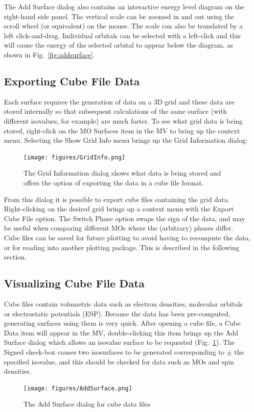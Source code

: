 \documentclass[a4paper,12pt]{article}
\begin{document}
The Add Surface dialog also contains an interactive energy level diagram on the
right-hand side panel.  The vertical scale can be zoomed in and out using the
scroll wheel (or equivalent) on the mouse.  The scale can also be translated by
a left click-and-drag.  Individual orbitals can be selected with a left-click
and this will cause the energy of the selected orbital to appear below the
diagram, as shown in Fig.~\ref{fig:addsurface}.


\subsection{Exporting Cube File Data}

Each surface requires the generation of data on a 3D grid and these data are
stored internally so that subsequent calculations of the same surface (with
different isovalues, for example) are much faster.  To see what grid data is
being stored, right-click on the MO Surfaces item in the MV to bring up the
context menu.  Selecting the Show Grid Info menu brings up the Grid Information
dialog:
\begin{figure}[h]
\begin{center}
\texttt{[image: figures/GridInfo.png]}
\caption{The Grid Information dialog shows what data is being stored and
offers the option of exporting the data in a cube file format.}
\end{center}
\end{figure}

From this dialog it is possible to export cube files containing the grid data.
Right-clicking on the desired grid brings up a context menu with the 
Export Cube File option.  The Switch Phase option swaps the sign of the data,
and may be useful when comparing different MOs where the (arbitrary) phases
differ.  Cube files can be saved for future plotting to avoid having to
recompute the data, or for reading into another plotting package.  This is
described in the following section.


\newpage
\subsection{Visualizing Cube File Data}

Cube files contain volumetric data such as electron densities, molecular
orbitals or electrostatic potentials (ESP).  Because the data has been
pre-computed, generating surfaces using them is very quick.  After opening a
cube file, a Cube Data item will appear in the MV, double-clicking this item
brings up the Add Surface dialog which allows an isovalue surface to be
requested (Fig.~\ref{fig:cubefile}).  The Signed check-box causes two
isosurfaces to be generated corresponding to $\pm$ the specified isovalue, and
this should be checked for data such as MOs and spin densities.
\begin{figure}[h]
\begin{center}
\texttt{[image: figures/AddSurface.png]}
\caption{The Add Surface dialog for cube data files}
\label{fig:cubefile}
\end{center}
\end{figure}
\end{document}
